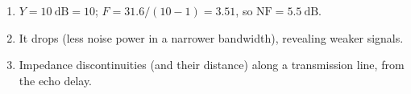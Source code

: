 \begin{enumerate}[leftmargin=1.6em,itemsep=2pt]
\item $Y = 10\ \text{dB} = 10$; $F = 31.6/(10-1) = 3.51$, so $\text{NF} = 5.5\ \text{dB}$.
\item It drops (less noise power in a narrower bandwidth), revealing weaker signals.
\item Impedance discontinuities (and their distance) along a transmission line, from the echo delay.
\end{enumerate}
